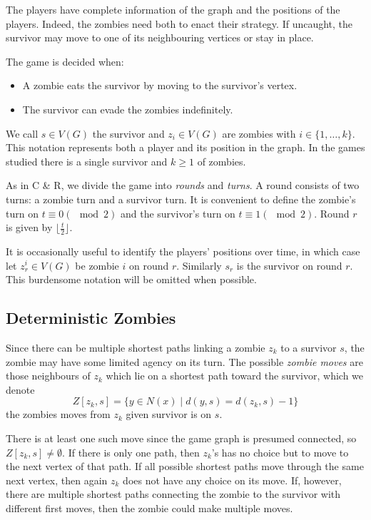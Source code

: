 The players have complete information of the graph and the positions of the players. Indeed, the zombies need both to enact their strategy. If uncaught, the survivor may move to one of its neighbouring vertices or stay in place.

The game is decided when:
\begin{itemize}
\item A zombie eats the survivor by moving to the survivor's vertex.
\item The survivor can evade the zombies indefinitely.
\end{itemize}

We call $s \in V(G)$ the survivor and $z_i \in V(G)$ are zombies with $i \in \{1, \dots, k\}$.
This notation represents both a player and its position in the graph.
In the games studied there is a single survivor and $k \geq 1$ of zombies.

As in C \& R, we divide the game into \textit{rounds} and \textit{turns}. A round consists of two turns: a zombie turn and a survivor turn.
It is convenient to define the zombie's turn on $t \equiv 0 (\mod{2})$ and the survivor's turn on $t \equiv 1 (\mod{2})$.
Round $r$ is given by $\lfloor \frac{t}{2} \rfloor$.

It is occasionally useful to identify the players' positions over time, in which
case let $z_r^i \in V(G)$ be zombie $i$ on round $r$. Similarly $s_r$ is the
survivor on round $r$. This burdensome notation will be omitted when possible.

\subsection{Deterministic Zombies}\label{subsection intro deterministic}

Since there can be multiple shortest paths linking a zombie $z_k$ to a survivor $s$, the zombie may have some limited agency on its turn. The possible \textit{zombie moves}
are those neighbours of $z_k$ which lie on a shortest path toward the survivor, which we denote
\[ Z[z_k, s] = \{ y \in N(x) \mid d(y, s) = d(z_k, s) - 1 \} \]
the zombies moves from $z_k$ given survivor is on $s$.

There is at least one such move since the game graph is presumed connected,
so $Z[z_k,s] \neq \emptyset$. If there is only one path, then $z_k$'s has no choice but to move to the next vertex of that path. If all possible shortest paths move through the same next vertex, then again $z_k$ does not have any choice on its move. If, however, there are multiple shortest paths connecting the zombie to the survivor with different first moves, then the zombie could make multiple moves.

